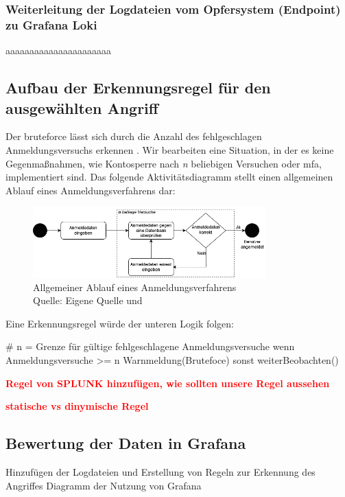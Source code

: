 \subsubsection{Weiterleitung der Logdateien vom Opfersystem (\gls{Endpoint}) zu Grafana Loki}
aaaaaaaaaaaaaaaaaaaaaa

\subsection{Aufbau der Erkennungsregel für den ausgewählten Angriff}
Der \gls{bruteforce} lässt sich durch die Anzahl des fehlgeschlagen Anmeldungsversuchs erkennen \citep{Selvaganesh_SplunkBruteForce}. Wir bearbeiten eine Situation, in der es keine Gegenmaßnahmen, wie Kontosperre nach \textit{n} beliebigen Versuchen oder \gls{mfa}, implementiert sind. Das folgende Aktivitätsdiagramm stellt einen allgemeinen Ablauf eines Anmeldungsverfahrens dar:

\begin{figure}[H]
   \centering
   \includegraphics[width=0.8\textwidth]{assets/Anmeldeverfahren.drawio.png}
   \caption{Allgemeiner Ablauf eines Anmeldungsverfahrens \\Quelle: Eigene Quelle und \citep{Selvaganesh_SplunkBruteForce}}
   \centering
\end{figure}

Eine Erkennungsregel würde der unteren Logik folgen:
{
\begin{spverbatim}
   # n = Grenze für gültige fehlgeschlagene Anmeldungsversuche
   wenn Anmeldungsversuche >= n
      Warnmeldung(Brutefoce)
   sonst
      weiterBeobachten()
\end{spverbatim}
}

\textcolor{red}{\textbf{Regel von SPLUNK hinzufügen, wie sollten unsere Regel aussehen}}

\textcolor{red}{\textbf{statische vs dinymische Regel}}





\subsection{Bewertung der Daten in Grafana}
Hinzufügen der Logdateien und Erstellung von Regeln zur Erkennung des Angriffes
Diagramm der Nutzung von Grafana

